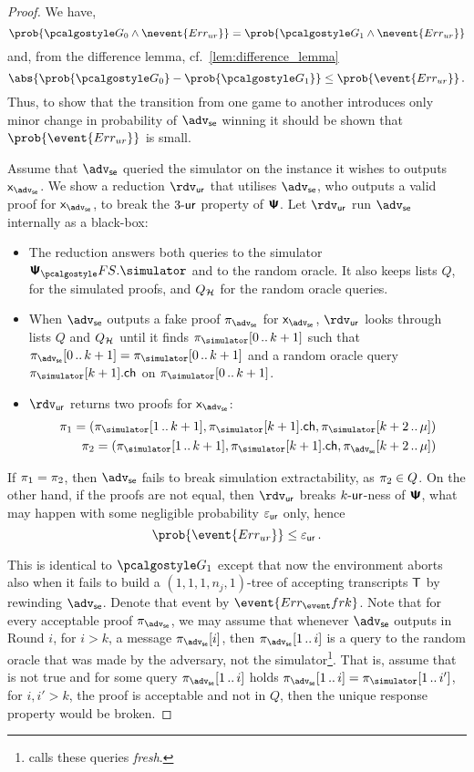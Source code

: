 \let\accentvec\vec \documentclass[runningheads,10pt]{llncs}
\begin{document}
\begin{proof}
	We have, 
	\[
		\prob{\game{0} \land \nevent{\errur}} = \prob{\game{1} \land \nevent{\errur}}
	\]
	and, from the difference lemma, cf.~\cref{lem:difference_lemma}
	\[
		\abs{\prob{\game{0}} - \prob{\game{1}}} \leq \prob{\event{\errur}}\,.
	\]
	Thus, to show that the transition from one game to another introduces only minor change in probability of $\advse$ winning it should be shown that $\prob{\event{\errur}}$ is small.
	
	Assume that $\advse$ queried the simulator on the instance it wishes to
	outputs $\inp_{\advse}$. 
	We show a reduction $\rdvur$ that utilises $\advse$, who outputs a valid proof for $\inp_\advse$, to break the ${3\text{-}\mathsf{ur}}$ property of $\bm{\mathsf{\Psi}}$. 
Let $\rdvur$ run $\advse$ internally as a black-box:
	\begin{itemize}
		\item The reduction answers both queries to the simulator $\psfs.\simulator$ and to the random oracle. 
		It also keeps lists $Q$, for the simulated proofs, and $Q_{\mathcal{H}}$ for the random oracle queries. 
		\item When $\advse$ outputs a fake proof $\zkproof_{\advse}$ for  $\inp_\advse$, $\rdvur$ looks through lists $Q$ and $Q_{\mathcal{H}}$ until it finds 
		$\zkproof_{\simulator}\range{0}{k + 1}$ such that
		$\zkproof_{\advse}\range{0}{k + 1} = \zkproof_{\simulator}\range{0}{k +
		1}$ and a random oracle query $\zkproof_{\simulator}[k + 1].\ch$ on
		$\zkproof_{\simulator}\range{0}{k + 1}$.
		\item $\rdvur$ returns two proofs for $\inp_\advse$:
		\begin{align*}
			\zkproof_1 = (\zkproof_{\simulator}\range{1}{k + 1},
			\zkproof_{\simulator}[k + 1].\ch, \zkproof_{\simulator}\range{k +
			2}{\mu})\\
			\zkproof_2 = (\zkproof_{\simulator}\range{1}{k + 1},
			\zkproof_{\simulator}[k + 1].\ch, \zkproof_{\advse}\range{k + 2}{\mu})
		\end{align*}
		\end{itemize}  
		If $\pi_1 = \pi_2$, then $\advse$ fails to break simulation extractability, as $\pi_2 \in Q$.
		On the other hand, if the proofs are not equal, then $\rdvur$ breaks ${k\text{-}\mathsf{ur}}$-ness of $\bm{\mathsf{\Psi}}$, what may happen with some negligible probability $\varepsilon_{\mathsf{ur}}$ only, hence
		\[
			\prob{\event{\errur}} \leq \epsur\,.
		\]
		
	This is identical to $\game{1}$ except that now the environment aborts also
	when it fails to build a $(1, 1, 1, n_j, 1)$-tree of accepting transcripts
	$\mathsf{T}$ by rewinding $\advse$. Denote that event by $\event{\errfrk}$.
	Note that for every acceptable proof $\zkproof_{\advse}$, we may
	assume that whenever $\advse$ outputs in Round $i$, for $i > k$, a message
	$\zkproof_{\advse}[i]$, then $\zkproof_{\advse}\range{1}{i}$ is a query to
	the random oracle that was made by the adversary, not the
	simulator\footnote{\cite{INDOCRYPT:FKMV12} calls these queries
	\emph{fresh}.}.  That is, assume that is not true and for some query
	$\zkproof_{\advse}\range{1}{i}$ holds $\zkproof_{\advse}\range{1}{i} =
	\zkproof_\simulator\range{1}{i'}$, for $i, i' > k$, the proof is acceptable
	and not in $Q$, then the unique response property would be broken.
	

\end{proof}
\end{document}
